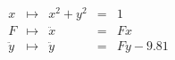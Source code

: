 \documentclass[preview]{standalone}
\begin{document}
    \begin{align}
      x &\mapsto& x^2 + y^2 &=& 1\\
      F &\mapsto& \ddot{x} &=& F x \\
      \ddot{y} &\mapsto& \ddot{y} &=& F y - 9.81
    \end{align}
\end{document}

